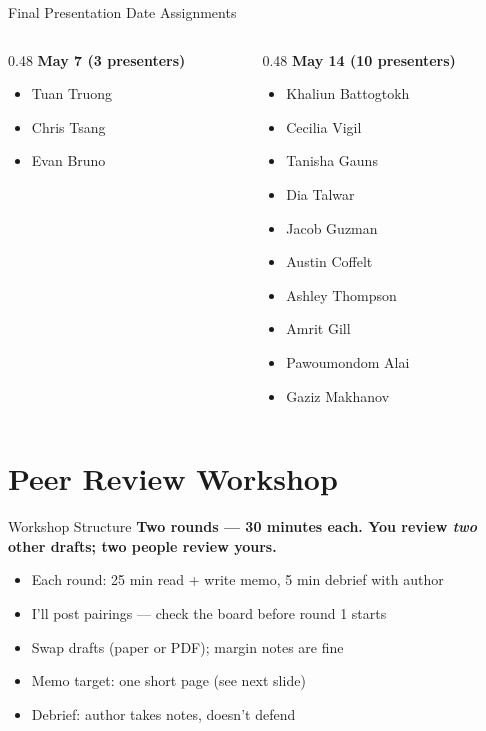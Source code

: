 \begin{frame}{Final Presentation Date Assignments}
  \begin{columns}[T]
    \begin{column}{0.48\textwidth}
      \textbf{\textcolor{usfgreen}{May 7 (3 presenters)}}
      \begin{itemize}\setlength\itemsep{1pt}
        \item Tuan Truong
        \item Chris Tsang
        \item Evan Bruno
      \end{itemize}
    \end{column}
    \begin{column}{0.48\textwidth}
      \textbf{\textcolor{usfgreen}{May 14 (10 presenters)}}
      \footnotesize
      \begin{itemize}\setlength\itemsep{0pt}
        \item Khaliun Battogtokh
        \item Cecilia Vigil
        \item Tanisha Gauns
        \item Dia Talwar
        \item Jacob Guzman
        \item Austin Coffelt
        \item Ashley Thompson
        \item Amrit Gill
        \item Pawoumondom Alai
        \item Gaziz Makhanov
      \end{itemize}
    \end{column}
  \end{columns}
\end{frame}

\section{Peer Review Workshop}

\begin{frame}{Workshop Structure}
  \textbf{Two rounds --- 30 minutes each. You review \emph{two} other drafts; two people review yours.}

  \vspace{8pt}

  \begin{itemize}\setlength\itemsep{2pt}
    \item Each round: 25 min read + write memo, 5 min debrief with author
    \item I'll post pairings --- check the board before round 1 starts
    \item Swap drafts (paper or PDF); margin notes are fine
    \item Memo target: one short page (see next slide)
    \item Debrief: author takes notes, doesn't defend
  \end{itemize}
\end{frame}

